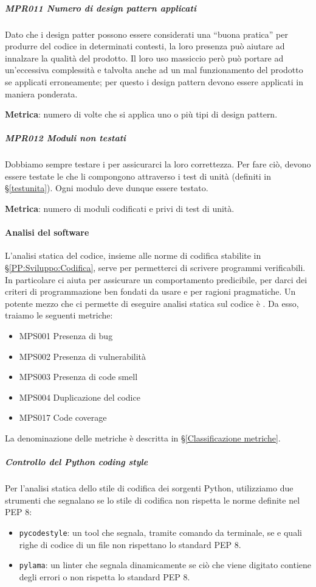             \subparagraph{MPR011 Numero di design pattern applicati}
            Dato che i design patter possono essere considerati una ``buona pratica'' per produrre del codice in determinati contesti, la loro presenza può aiutare ad innalzare la qualità del prodotto. Il loro uso massiccio però può portare ad un'eccessiva complessità e talvolta anche ad un mal funzionamento del prodotto se applicati erroneamente; per questo i design pattern devono essere applicati in maniera ponderata.

            \textbf{Metrica}: numero di volte che si applica uno o più tipi di design pattern.

            \subparagraph{MPR012 Moduli non testati}
            Dobbiamo sempre testare i  per assicurarci la loro correttezza. Per fare ciò, devono essere testate le  che li compongono attraverso i test di unità (definiti in \S\ref{testunita}).
            Ogni modulo deve dunque essere testato.

            \textbf{Metrica}: numero di moduli codificati e privi di test di unità.


			\paragraph{Analisi del software} \label{analisisw}
			L'analisi statica del codice, insieme alle norme di codifica stabilite in \S\ref{PP:Sviluppo:Codifica}, serve per permetterci di scrivere programmi verificabili.
			In particolare ci aiuta per assicurare un comportamento predicibile, per darci dei criteri di programmazione ben fondati da usare e per ragioni pragmatiche.
			Un potente mezzo che ci permette di eseguire analisi statica sul codice è .
			Da esso, traiamo le seguenti metriche:
			\begin{itemize}
				\item MPS001 Presenza di bug
				\item MPS002 Presenza di vulnerabilità
				\item MPS003 Presenza di code smell
				\item MPS004 Duplicazione del codice
				\item MPS017 Code coverage
			\end{itemize}

			La denominazione delle metriche è descritta in \S\ref{Classificazione metriche}.

			\subparagraph{Controllo del Python coding style}\label{pycodestyle}
			Per l'analisi statica dello stile di codifica dei sorgenti Python, utilizziamo due strumenti che segnalano se lo stile di codifica non rispetta
			le norme definite nel PEP 8:
			\begin{itemize}
				\item \texttt{pycodestyle}: un tool che segnala, tramite comando da terminale, se e quali righe di codice di un file non rispettano lo standard PEP 8.
				\item \texttt{pylama}: un linter che segnala dinamicamente se ciò che viene digitato contiene degli errori o non rispetta
					lo standard PEP 8.
			\end{itemize}

